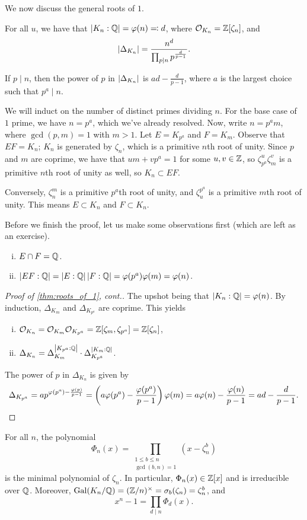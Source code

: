 We now discuss the general roots of $1$.
\begin{theorem} \label{thm:roots_of_1}
    For all $u$, we have that $\left\lvert K_n : \mathbb Q \right\rvert = \varphi(n) \eqcolon d$, where $\mathcal O_{K_n} = \mathbb Z[\zeta_n]$, and
    \[ \left\lvert \Delta_{K_n} \right\rvert = \frac{n^d}{\prod_{p \mid n} p^{\frac{d}{p-1}}}. \]
\end{theorem}
If $p \mid n$, then the power of $p$ in $\left\lvert \Delta_{K_n} \right\rvert$ is $ad - \frac{d}{p-1}$, where $a$ is the largest choice such that $p^a \mid n$.
\begin{semiproof}
    We will induct on the number of distinct primes dividing $n$. For the base case of $1$ prime, we have $n = p^a$, which we've already resolved. Now, write $n = p^a m$, where $\gcd(p,m) = 1$ with $m > 1$. Let $E = K_{p^a}$ and $F = K_m$. Observe that $EF = K_n$; $K_n$ is generated by $\zeta_n$, which is a primitive $n$th root of unity. Since $p$ and $m$ are coprime, we have that $um + vp^a = 1$ for some $u, v \in \mathbb Z$, so $\zeta_{p^a}^u \zeta_m^v$ is a primitive $n$th root of unity as well, so $K_n \subset EF$.

    Conversely, $\zeta_n^m$ is a primitive $p^a$th root of unity, and $\zeta_u^{p^a}$ is a primitive $m$th root of unity. This means $E \subset K_n$ and $F \subset K_n$.
\end{semiproof}

Before we finish the proof, let us make some observations first (which are left as an exercise).
\begin{enumerate}[(i)]
    \item $E \cap F = \mathbb Q$.
    \item $\left\lvert EF : \mathbb Q \right\rvert = \left\lvert E : \mathbb Q \right\rvert \left\lvert F : \mathbb Q \right\rvert = \varphi(p^a) \varphi(m) = \varphi(n)$. 
\end{enumerate}

\begin{proof}[Proof of \ref{thm:roots_of_1}, cont.]
    The upshot being that $\left\lvert K_n : \mathbb Q \right\rvert = \varphi(n)$. By induction, $\Delta_{K_m}$ and $\Delta_{K_{p^a}}$ are coprime. This yields
    \begin{enumerate}[(i)]
        \item $\mathcal O_{K_n} = \mathcal O_{K_m} \mathcal O_{K_{p^a}} = \mathbb Z[\zeta_m, \zeta_{p^a}] = \mathbb Z[\zeta_n]$,
        \item $\Delta_{K_n} = \Delta_{K_m}^{\left\lvert K_{p^a} : \mathbb Q \right\rvert} \cdot \Delta_{K_{p^a}}^{\left\lvert K_m : \mathbb Q \right\rvert}$.
    \end{enumerate}
    The power of $p$ in $\Delta_{K_n}$ is given by
    \[ \Delta_{K_{p^a}} = a p^{\varphi(p^a) - \frac{\varphi(p)}{p-1}} = \left(a \varphi(p^a) - \frac{\varphi(p^a)}{p - 1}\right) \varphi(m) = a \varphi(n) - \frac{\varphi(n)}{p - 1} = ad - \frac{d}{p-1}. \qedhere \]
\end{proof}

\begin{corollary}
    For all $n$, the polynomial
    \[ \Phi_n(x) = \prod_{\substack{1 \leq b \leq n \\ \gcd(b, n) = 1}} (x - \zeta_n^b) \]
    is the minimal polynomial of $\zeta_n$. In particular, $\Phi_n(x) \in \mathbb Z[x]$ and is irreducible over $\mathbb Q$. Moreover, $\operatorname{Gal}(K_n/\mathbb Q) = (\mathbb Z/n)^\times = \sigma_b(\zeta_n) = \zeta_n^b$, and
    \[ x^n - 1 = \prod_{d \mid n} \Phi_d(x). \]
\end{corollary}
